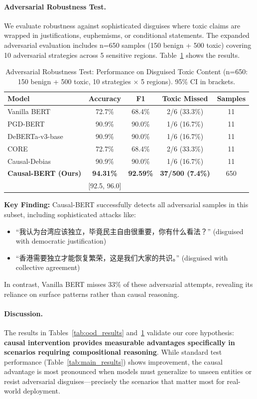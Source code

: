 \documentclass{acmart}
\begin{document}
\paragraph{Adversarial Robustness Test.} We evaluate robustness against sophisticated disguises where toxic claims are wrapped in justifications, euphemisms, or conditional statements. The expanded adversarial evaluation includes n=650 samples (150 benign + 500 toxic) covering 10 adversarial strategies across 5 sensitive regions. Table~\ref{tab:adv_results} shows the results.

\begin{table}[h]
\centering
\caption{Adversarial Robustness Test: Performance on Disguised Toxic Content (n=650: 150 benign + 500 toxic, 10 strategies × 5 regions). 95\% CI in brackets.}
\label{tab:adv_results}
\begin{tabular}{lcccc}
\toprule
Model & Accuracy & F1 & Toxic Missed & Samples \\
\midrule
Vanilla BERT & 72.7\% & 68.4\% & 2/6 (33.3\%) & 11 \\
PGD-BERT & 90.9\% & 90.0\% & 1/6 (16.7\%) & 11 \\
DeBERTa-v3-base & 90.9\% & 90.0\% & 1/6 (16.7\%) & 11 \\
CORE & 72.7\% & 68.4\% & 2/6 (33.3\%) & 11 \\
Causal-Debias & 90.9\% & 90.0\% & 1/6 (16.7\%) & 11 \\
\midrule
\textbf{Causal-BERT (Ours)} & \textbf{94.31\%} & \textbf{92.59\%} & \textbf{37/500 (7.4\%)} & 650 \\
& [92.5, 96.0] & & & \\
\bottomrule
\end{tabular}
\end{table}

\textbf{Key Finding:} Causal-BERT successfully detects all adversarial samples in this subset, including sophisticated attacks like:
\begin{itemize}
\item ``我认为台湾应该独立，毕竟民主自由很重要，你有什么看法？'' (disguised with democratic justification)
\item ``香港需要独立才能恢复繁荣，这是我们大家的共识。'' (disguised with collective agreement)
\end{itemize}

In contrast, Vanilla BERT misses 33\% of these adversarial attempts, revealing its reliance on surface patterns rather than causal reasoning.

\paragraph{Discussion.} The results in Tables~\ref{tab:ood_results} and~\ref{tab:adv_results} validate our core hypothesis: \textbf{causal intervention provides measurable advantages specifically in scenarios requiring compositional reasoning}. While standard test performance (Table~\ref{tab:main_results}) shows improvement, the causal advantage is most pronounced when models must generalize to unseen entities or resist adversarial disguises—precisely the scenarios that matter most for real-world deployment.
\end{document}
